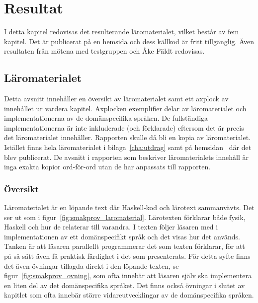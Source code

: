 \chapter{Resultat}

I detta kapitel redovisas det resulterande läromaterialet, vilket består av fem
kapitel. Det är publicerat på en hemsida och dess källkod är fritt tillgänglig.
Även resultaten från mötena med testgruppen och Åke Fäldt
redovisas.

\section{Läromaterialet}\label{sec:res_laromaterial}

Detta avsnitt innehåller en översikt av läromaterialet samt ett axplock av innehållet ur
vardera kapitel. Axplocken exemplifier delar av läromaterialet och
implementationerna av de domänspecifika språken. De fullständiga implementationerna
är inte inkluderade (och förklarade) eftersom det är precis det läromaterialet
innehåller. Rapporten skulle då bli en kopia av läromaterialet. Istället finns hela läromaterialet i bilaga~\ref{cha:utdrag} samt på hemsidan~\cite{LYAP} där det blev publicerat. De avsnitt i rapporten som beskriver läromaterialets innehåll är inga
exakta kopior ord-för-ord utan de har anpassats till
rapporten.

\subsection{Översikt}

Läromaterialet är en löpande text där Haskell-kod och lärotext sammanvävts. Det
ser ut som i figur~\ref{fig:smakprov_laromaterial}. Lärotexten förklarar både fysik, Haskell och hur de relaterar till varandra. I texten följer läsaren med
i implementationen av ett domänspecifikt språk och det visas hur det används.
Tanken är att läsaren parallellt programmerar det som texten förklarar, för att
på så sätt även få praktisk färdighet i det som presenterats. För detta syfte
finns det även övningar tillagda direkt i den löpande texten, se
figur~\ref{fig:smakprov_ovning}, som ofta innebär att läsaren själv ska
implementera en liten del av det domänspecifika språket. Det finns också
övningar i slutet av kapitlet som ofta innebär större vidareutvecklingar av de
domänspecifika språken.

